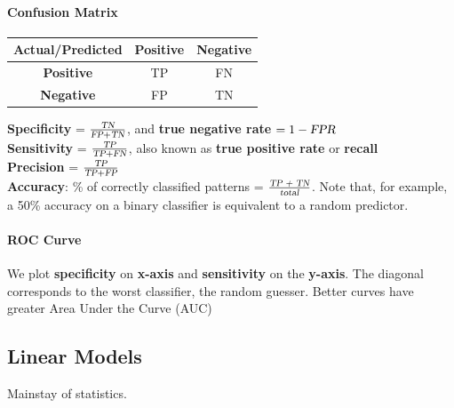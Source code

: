 \documentclass[10pt]{report}
\begin{document}
\paragraph{Confusion Matrix} \begin{center}
	\begin{tabular}{|c|c|c|}
		\hline
		Actual/Predicted & \textbf{Positive} & \textbf{Negative}\\
		\hline
		\textbf{Positive} & TP & FN\\
		\hline
		\textbf{Negative} & FP & TN\\
		\hline
	\end{tabular}
\end{center}
\textbf{Specificity} = $\frac{\textsl{TN}}{\textsl{FP} + \textsl{TN}}$, and \textbf{true negative rate} $= 1 - \textsl{FPR}$\\
\textbf{Sensitivity} = $\frac{\textsl{TP}}{\textsl{TP} + \textsl{FN}}$, also known as \textbf{true positive rate} or \textbf{recall}\\
\textbf{Precision} = $\frac{\textsl{TP}}{\textsl{TP} + \textsl{FP}}$\\
\textbf{Accuracy}: \% of correctly classified patterns = $\frac{\textsl{TP + TN}}{\textsl{total}}$. Note that, for example, a 50\% accuracy on a binary classifier is equivalent to a random predictor.
\paragraph{ROC Curve} We plot \textbf{specificity} on \textbf{x-axis} and \textbf{sensitivity} on the \textbf{y-axis}. The diagonal corresponds to the worst classifier, the random guesser. Better curves have greater Area Under the Curve (AUC)
\subsection{Linear Models} Mainstay of statistics.
\end{document}
